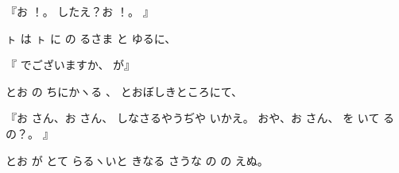 『お
！。
したえ？お
！。
』

ㇳ
は
ㇳ
に
の
るさま
と
ゆるに、

『
でございますか、
が』

とお
の
ちにかヽる
、
とおぼしきところにて、

『お
さん、お
さん、
しなさるやうぢや
いかえ。
おや、お
さん、
を
いて
るの？。
』

とお
が
とて
らるヽいと
きなる
さうな
の
の
えぬ。

